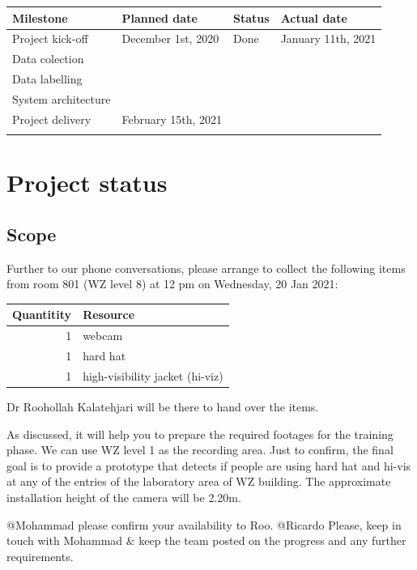\documentclass{article}
\begin{document}
\begin{center}
\begin{tabular}{llll}
Milestone & Planned date & Status & Actual date\\
\hline
Project kick-off & December 1st, 2020 & Done & January 11th, 2021\\
Data colection &  &  & \\
Data labelling &  &  & \\
System architecture &  &  & \\
Project delivery & February 15th, 2021 &  & \\
 &  &  & \\
\end{tabular}
\end{center}

\section{Project status}
\label{sec:org3f1da50}

\subsection{Scope}
\label{sec:orgc79852a}
Further to our phone conversations, please arrange to collect the following items from room 801 (WZ level 8) at 12 pm on Wednesday, 20 Jan 2021:

\begin{center}
\begin{tabular}{rl}
Quantitity & Resource\\
\hline
1 & webcam\\
1 & hard hat\\
1 & high-visibility jacket (hi-viz)\\
\end{tabular}
\end{center}

Dr Roohollah Kalatehjari will be there to hand over the items.

As discussed, it will help you to prepare the required footages for the training phase.
We can use WZ level 1 as the recording area. Just to confirm, the final goal is to provide a prototype that detects if people are using hard hat and hi-vis at any of the entries of the laboratory area of WZ building.
The approximate installation height of the camera will be 2.20m.

@Mohammad please confirm your availability to Roo.
@Ricardo Please, keep in touch with Mohammad \& keep the team posted on the progress and any further requirements.
\end{document}
